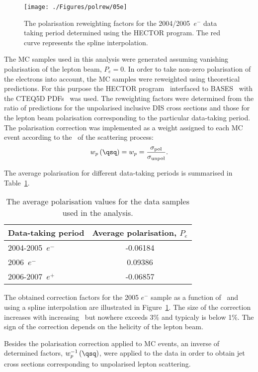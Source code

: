 \label{sec:polcor}
\begin{figure}[h]
 \begin{center}
 \texttt{[image: ./Figures/polrew/05e]}
\end{center}
\caption{The polarisation reweighting factors for the 2004/2005~$e^-$ data taking period determined using the HECTOR program. The red curve represents the spline interpolation.}
\label{fig:polcor05e}
\end{figure} 
The MC samples used in this analysis were generated assuming vanishing polarisation of the lepton beam, $P_e = 0$. In order to take non-zero polarisation of the electrons into account, the MC samples were reweighted using theoretical predictions. For this purpose the HECTOR program~\cite{cpc:94:128} interfaced to BASES~\cite{upub:Nagano:url} with the CTEQ5D PDFs~\cite{pr:d51:4763} was used. The reweighting factors were determined from the ratio of predictions for the unpolarised inclusive DIS cross sections and those for the lepton beam polarisation corresponding to the particular data-taking period. The polarisation correction was implemented as a weight assigned to each MC event according to the \qsq~of the scattering process:
\begin{equation}
 w_p\left(\qsq\right) = w_p = \frac{\sigma_\mathrm{pol}}{\sigma_\mathrm{unpol}}.
\end{equation}

The average polarisation for different data-taking periods is summarised in Table~\ref{tab:polvalues}.
\begin{table}[h]
 \centering
 \begin{tabular}{lc}
 Data-taking period & Average polarisation, $P_e$ \\
\hline
 2004-2005~$e^-$   & -0.06184 \\
 2006~$e^-$   & 0.09386  \\
 2006-2007~$e^+$ & -0.06857
\end{tabular} 
\caption{The average polarisation values for the data samples used in the analysis.}
\label{tab:polvalues}
\end{table}
The obtained correction factors for the 2005 $e^-$ sample as a function of \qsq~and using a spline interpolation are illustrated in Figure~\ref{fig:polcor05e}. The size of the correction increases with increasing \qsq~but nowhere exceeds 3\% and typicaly is below 1\%. The sign of the correction depends on the helicity of the lepton beam.

Besides the polarisation correction applied to MC events, an inverse of determined factors, $w_p^{-1}\left(\qsq\right)$, were applied to the data in order to obtain jet cross sections corresponding to unpolarised lepton scattering.